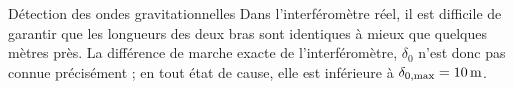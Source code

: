 \begin{exo}[PC][1][devoir]{Détection des ondes gravitationnelles}
Dans l'interféromètre réel, il est difficile de garantir que les longueurs des deux bras sont identiques à mieux que quelques mètres près. La différence de marche exacte de l'interféromètre, $\delta_0$  n'est donc pas connue précisément ; en tout état de cause, elle est inférieure à  $\delta_{0,\rm max}= \SI{10}{m}$.

\begin{quest}
\end{quest}






\end{exo}
